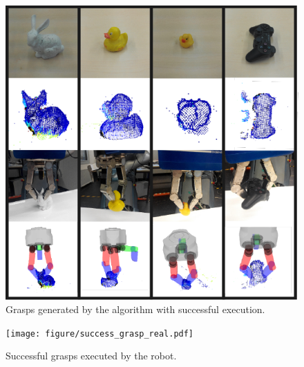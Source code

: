\begin{figure}[!htpb]
\centering
\includegraphics[width=0.8\linewidth]{figure/successful_grasps_illustration.pdf}
\caption{Grasps generated by the algorithm with successful execution.}
\label{fig:grasp_example} 
\end{figure}

\begin{figure}[!htpb]
\centering
\texttt{[image: figure/success\_grasp\_real.pdf]}
\caption{Successful grasps executed by the robot. }
\label{fig:success_grasps}
\end{figure}



